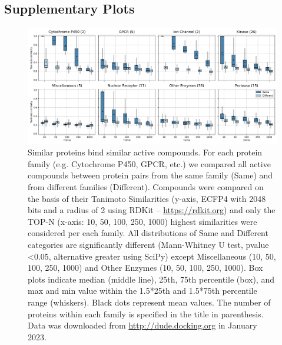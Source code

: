 
\setcounter{section}{4} %
\setcounter{figure}{0}  %
\label{PocketVec_SupplementaryInformation}


\subsection{Supplementary Plots}



\begin{figure}[htbp]
  \centering
  \includegraphics[width=\linewidth]{figures/PocketVec/Supplementary/FigS1.png}
  \caption{Similar proteins bind similar active compounds. For each protein family (e.g. Cytochrome P450, GPCR, etc.) we compared all active compounds between protein pairs from the same family (Same) and from different families (Different). Compounds were compared on the basis of their Tanimoto Similarities (y-axis, ECFP4 with 2048 bits and a radius of 2 using RDKit – \href{https://rdkit.org}{https://rdkit.org}) and only the TOP-N (x-axis: 10, 50, 100, 250, 1000) highest similarities were considered per each family. All distributions of Same and Different categories are significantly different (Mann-Whitney U test, pvalue <0.05, alternative greater using SciPy\cite{virtanen_scipy_2020}) except Miscellaneous (10, 50, 100, 250, 1000) and Other Enzymes (10, 50, 100, 250, 1000). Box plots indicate median (middle line), 25th, 75th percentile (box), and max and min value within the 1.5*25th and 1.5*75th percentile range (whiskers). Black dots represent mean values. The number of proteins within each family is specified in the title in parenthesis. Data was downloaded from \href{http://dude.docking.org}{http://dude.docking.org} in January 2023.}
  \label{PocketVec_FigS1}
\end{figure}


